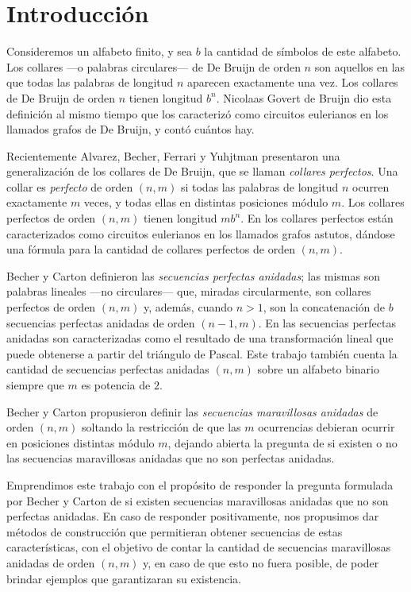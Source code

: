 \chapter{Introducción}

Consideremos un alfabeto finito, y sea $b$ la
cantidad de símbolos de este alfabeto.
Los collares ---o palabras circulares--- de
De Bruijn de orden $n$ son aquellos en las que todas las palabras de longitud
$n$ aparecen exactamente una vez.
Los collares de De Bruijn de orden $n$ tienen longitud $b^n$.
Nicolaas Govert de Bruijn \cite{de-bruijn-combinatorial-problem}
dio esta definición al mismo tiempo que los caracterizó como circuitos eulerianos
en los llamados grafos de De Bruijn, y contó cuántos hay.

Recientemente Alvarez, Becher, Ferrari y Yuhjtman \cite{alvarez-perfect-necklaces}
presentaron una generalización de los collares de De Bruijn,
que se llaman \emph{collares perfectos}.
Una collar es \emph{perfecto} de orden $(n,m)$ si todas las palabras 
de longitud $n$ ocurren exactamente $m$ veces, y todas ellas en distintas
posiciones módulo $m$.
Los collares perfectos de orden $(n,m)$ tienen longitud $mb^n$.
En \cite{alvarez-perfect-necklaces} los collares perfectos están
caracterizados como circuitos eulerianos en los llamados grafos astutos,
dándose una fórmula para la cantidad de collares perfectos de orden $(n,m)$.

Becher y Carton \cite{becher-nested-perfect} definieron las
\emph{secuencias perfectas anidadas}; las mismas son palabras lineales ---no
circulares--- que, miradas circularmente, son collares perfectos de orden $(n,m)$
y, además, cuando $n>1$, son la concatenación de $b$ secuencias perfectas
anidadas de orden $(n-1, m)$.
En \cite{becher-nested-perfect} las secuencias perfectas anidadas son
caracterizadas como el resultado de una transformación lineal que puede
obtenerse a partir del triángulo de Pascal. Este trabajo también cuenta la
cantidad de secuencias perfectas anidadas $(n,m)$ sobre un alfabeto binario
siempre que $m$ es potencia de $2$.

Becher y Carton propusieron definir las \emph{secuencias maravillosas anidadas}
de orden $(n,m)$ soltando la restricción de que las $m$ ocurrencias debieran
ocurrir en posiciones distintas módulo $m$, dejando abierta la pregunta de si
existen o no las secuencias maravillosas anidadas que no son perfectas anidadas.

\medskip

Emprendimos este trabajo con el propósito de responder la pregunta formulada por
Becher y Carton de si existen secuencias maravillosas anidadas que no son
perfectas anidadas.
En caso de responder positivamente, nos propusimos dar métodos de construcción
que permitieran obtener secuencias de estas características, con el objetivo de contar la cantidad de secuencias maravillosas anidadas de orden
$(n,m)$ y, en caso de que esto no fuera posible, de poder brindar ejemplos que
garantizaran su existencia.

